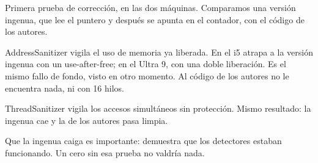 Primera prueba de corrección, en las dos máquinas. Comparamos una versión ingenua, que lee el puntero y después se apunta en el contador, con el código de los autores.

AddressSanitizer vigila el uso de memoria ya liberada. En el i5 atrapa a la versión ingenua con un use-after-free; en el Ultra 9, con una doble liberación. Es el mismo fallo de fondo, visto en otro momento. Al código de los autores no le encuentra nada, ni con 16 hilos.

ThreadSanitizer vigila los accesos simultáneos sin protección. Mismo resultado: la ingenua cae y la de los autores pasa limpia.

Que la ingenua caiga es importante: demuestra que los detectores estaban funcionando. Un cero sin esa prueba no valdría nada.
